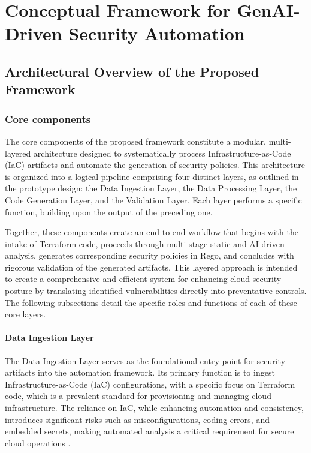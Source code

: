 \chapter{Conceptual Framework for GenAI-Driven Security Automation}

\section{Architectural Overview of the Proposed Framework}


\subsection{Core components} %
\label{sub:Core components}

The core components of the proposed framework constitute a modular, multi-layered architecture designed to systematically process Infrastructure-as-Code (IaC) artifacts and automate the generation of security policies. This architecture is organized into a logical pipeline comprising four distinct layers, as outlined in the prototype design: the Data Ingestion Layer, the Data Processing Layer, the Code Generation Layer, and the Validation Layer. Each layer performs a specific function, building upon the output of the preceding one.

Together, these components create an end-to-end workflow that begins with the intake of Terraform code, proceeds through multi-stage static and AI-driven analysis, generates corresponding security policies in Rego, and concludes with rigorous validation of the generated artifacts. This layered approach is intended to create a comprehensive and efficient system for enhancing cloud security posture by translating identified vulnerabilities directly into preventative controls. The following subsections detail the specific roles and functions of each of these core layers.

\subsubsection{Data Ingestion Layer} %
\label{sec:Data Ingestion Layer}

The Data Ingestion Layer serves as the foundational entry point for security artifacts into the automation framework. Its primary function is to ingest Infrastructure-as-Code (IaC) configurations, with a specific focus on Terraform code, which is a prevalent standard for provisioning and managing cloud infrastructure. The reliance on IaC, while enhancing automation and consistency, introduces significant risks such as misconfigurations, coding errors, and embedded secrets, making automated analysis a critical requirement for secure cloud operations \cite{hayagreevan_security_2024}.

